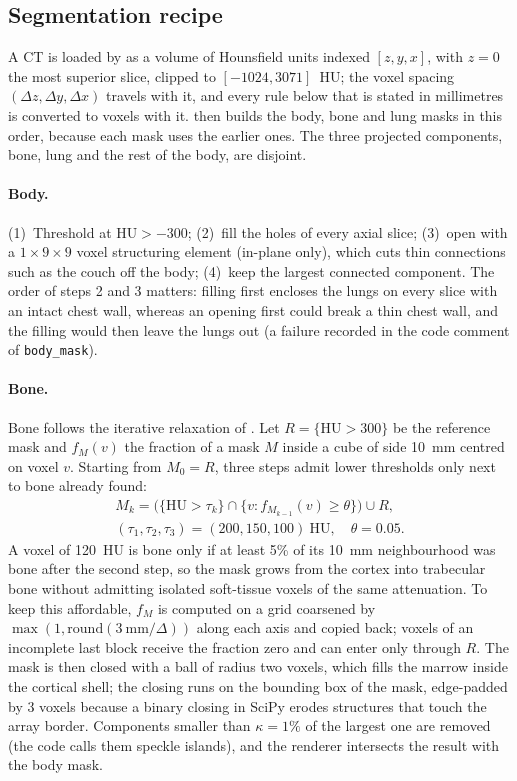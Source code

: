 \subsection{Segmentation recipe}
\label{ssec:dp-seg}
A CT is loaded by  as a volume of Hounsfield units indexed $[z,y,x]$, with $z=0$ the most superior slice, clipped to
$[-1024,3071]$~HU; the voxel spacing $(\Delta z,\Delta y,\Delta x)$ travels with it, and every rule below that is stated in millimetres is
converted to voxels with it.  then builds the body, bone and lung masks in this order, because each mask uses the earlier ones.
The three projected components, bone, lung and the rest of the body, are disjoint.

\paragraph{Body.} (1)~Threshold at $\mathrm{HU}>-300$; (2)~fill the holes of every axial slice; (3)~open with a $1\times9\times9$ voxel
structuring element (in-plane only), which cuts thin connections such as the couch off the body; (4)~keep the largest connected component. The
order of steps 2 and 3 matters: filling first encloses the lungs on every slice with an intact chest wall, whereas an opening first could break a
thin chest wall, and the filling would then leave the lungs out (a failure recorded in the code comment of \texttt{body\_mask}).

\paragraph{Bone.} Bone follows the iterative relaxation of \citet[Algorithm~1]{angaitkar2026anatomy}. Let $R=\{\mathrm{HU}>300\}$ be the
reference mask and $f_M(v)$ the fraction of a mask $M$ inside a cube of side 10~mm centred on voxel $v$. Starting from $M_0=R$, three steps admit
lower thresholds only next to bone already found:
\begin{equation}
\begin{gathered}
M_k = \big(\{\mathrm{HU}>\tau_k\}\cap\{v: f_{M_{k-1}}(v)\ge\theta\}\big)\cup R,\\
(\tau_1,\tau_2,\tau_3)=(200,150,100)~\mathrm{HU},
  \quad \theta=0.05 .
\end{gathered}
\label{eq:dp-bone}
\end{equation}
A voxel of 120~HU is bone only if at least 5\% of its 10~mm neighbourhood was bone after the second step, so the mask grows from the cortex into
trabecular bone without admitting isolated soft-tissue voxels of the same attenuation. To keep this affordable, $f_M$ is computed on a grid
coarsened by $\max(1,\mathrm{round}(3~\mathrm{mm}/\Delta))$ along each axis and copied back; voxels of an incomplete last block receive the
fraction zero and can enter only through $R$. The mask is then closed with a ball of radius two voxels, which fills the marrow inside the
cortical shell; the closing runs on the bounding box of the mask, edge-padded by 3 voxels because a binary closing in SciPy erodes structures
that touch the array border. Components smaller than $\kappa=1\%$ of the largest one are removed (the code calls them speckle islands), and the
renderer intersects the result with the body mask.

